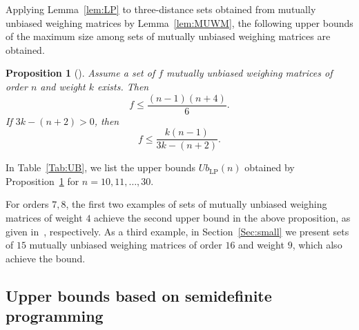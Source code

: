 \documentclass[12pt]{article}
\newtheorem{prop}[thm]{Proposition}
\theoremstyle{remark}
\newcommand{\RR}{\mathbb{R}}
\begin{document}


Applying Lemma~\ref{lem:LP} to three-distance sets obtained from mutually unbiased weighing matrices by Lemma~\ref{lem:MUWM}, 
the following upper bounds of 
the maximum size  among sets of mutually unbiased weighing matrices 
are obtained.

\begin{prop}[{\cite[Corollary 10]{BKR}}]\label{prop:f}
Assume a set of $f$ mutually unbiased weighing matrices of order $n$ and weight $k$ exists.
Then
\[
f \le \frac{(n-1)(n+4)}{6}.
\]
If $3k -(n+2) >0$, then
\[
f\le \frac{k(n-1)}{3k-(n+2)}.
\]
\end{prop}

In Table~\ref{Tab:UB},
we list the upper bounds $Ub_{\text{LP}}(n)$ obtained by Proposition~\ref{prop:f}
for $n=10,11,\ldots,30$.

For orders $7, 8$,
the first two examples of sets of mutually unbiased weighing matrices of
weight $4$ achieve the second upper bound in the above proposition, 
as given in~\cite[Theorems~21, 22]{BKR}, respectively.
As a third example, in Section~\ref{Sec:small}
we present sets of $15$ mutually unbiased weighing matrices of
order $16$ and weight $9$, which also achieve the bound.


\subsection{Upper  bounds based on semidefinite programming}

\end{document}
